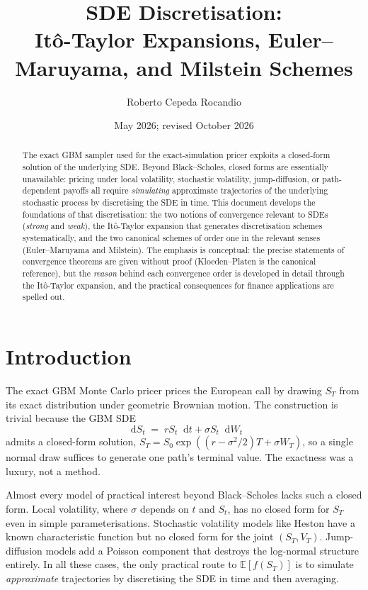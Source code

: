 \documentclass[11pt,a4paper]{article}
\title{SDE Discretisation:\\
       It\^o-Taylor Expansions, Euler--Maruyama, and Milstein Schemes}
\author{Roberto Cepeda Rocandio}
\date{May 2026; revised October 2026}
\theoremstyle{plain}
\theoremstyle{definition}
\theoremstyle{remark}
\newcommand{\E}{\mathbb{E}}
\newcommand{\dd}{\mathop{}\!\mathrm{d}}
\begin{document}
\maketitle

\begin{abstract}
The exact GBM sampler used for the exact-simulation pricer exploits a
closed-form
solution of the underlying SDE. Beyond Black--Scholes, closed forms
are essentially unavailable: pricing under local volatility, stochastic
volatility, jump-diffusion, or path-dependent payoffs all require
\emph{simulating} approximate trajectories of the underlying
stochastic process by discretising the SDE in time. This document
develops the foundations of that discretisation: the two notions of
convergence relevant to SDEs (\emph{strong} and \emph{weak}), the
It\^o-Taylor expansion that generates discretisation schemes
systematically, and the two canonical schemes of order one in the
relevant senses (Euler--Maruyama and Milstein). The emphasis is
conceptual: the precise statements of convergence theorems are given
without proof (Kloeden--Platen is the canonical reference), but the
\emph{reason} behind each convergence order is developed in detail
through the It\^o-Taylor expansion, and the practical consequences for
finance applications are spelled out.
\end{abstract}

\tableofcontents

\section{Introduction}
\label{sec:intro}

The exact GBM Monte Carlo pricer prices the European call by drawing
$S_T$ from its exact
distribution under geometric Brownian motion. The construction is
trivial because the GBM SDE
\begin{equation}
\dd S_t \;=\; r S_t \dd t + \sigma S_t \dd W_t
\end{equation}
admits a closed-form solution, $S_T = S_0 \exp((r - \sigma^2/2)T +
\sigma W_T)$, so a single normal draw suffices to generate one path's
terminal value. The exactness was a luxury, not a method.

Almost every model of practical interest beyond Black--Scholes lacks
such a closed form. Local volatility, where $\sigma$ depends on $t$
and $S_t$, has no closed form for $S_T$ even in simple parameterisations.
Stochastic volatility models like Heston have a known characteristic
function but no closed form for the joint $(S_T, V_T)$.
Jump-diffusion models add a Poisson component that destroys the
log-normal structure entirely. In all these cases, the only practical
route to $\E[f(S_T)]$ is to simulate \emph{approximate} trajectories
by discretising the SDE in time and then averaging.
\end{document}
